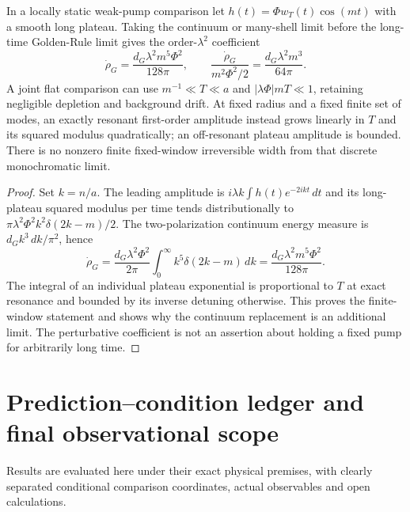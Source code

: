 \documentclass[12pt,a4paper]{article}
\begin{document}
\begin{proposition}
\label{p9:prop:v215-pulse-rate-order}
In a locally static weak-pump comparison let
$h(t)=\Phi w_T(t)\cos(mt)$ with a smooth long plateau.
Taking the continuum or many-shell limit before the long-time
Golden-Rule limit gives the order-$\lambda^2$ coefficient
\[
 \dot\rho_G=\frac{d_G\lambda^2m^5\Phi^2}{128\pi},\qquad
 \frac{\dot\rho_G}{m^2\Phi^2/2}
                =\frac{d_G\lambda^2m^3}{64\pi}.
\]
A joint flat comparison can use $m^{-1}\ll T\ll a$ and
$|\lambda\Phi|mT\ll1$, retaining negligible depletion and background
drift. At fixed radius and a fixed finite set of modes, an exactly
resonant first-order amplitude instead grows linearly in $T$ and its
squared modulus quadratically; an off-resonant plateau amplitude is
bounded. There is no nonzero finite fixed-window irreversible width
from that discrete monochromatic limit.
\end{proposition}
\begin{proof}
Set $k=n/a$. The leading amplitude is
$i\lambda k\int h(t)e^{-2ikt}\,dt$ and its long-plateau squared
modulus per time tends distributionally to
$\pi\lambda^2\Phi^2k^2\delta(2k-m)/2$.
The two-polarization continuum energy measure is
$d_Gk^3\,dk/\pi^2$, hence
\[
 \dot\rho_G=\frac{d_G\lambda^2\Phi^2}{2\pi}
       \int_0^\infty k^5\delta(2k-m)\,dk
       =\frac{d_G\lambda^2m^5\Phi^2}{128\pi}.
\]
The integral of an individual plateau exponential is proportional to
$T$ at exact resonance and bounded by its inverse detuning otherwise.
This proves the finite-window statement and shows why the continuum
replacement is an additional limit. The perturbative coefficient is
not an assertion about holding a fixed pump for arbitrarily long time.
\end{proof}



\section{Prediction–condition ledger and final observational scope}
\label{p6b:sec:organized-b7}
Results are evaluated here under their exact physical premises, with clearly separated conditional comparison coordinates, actual observables and open calculations.

\end{document}
